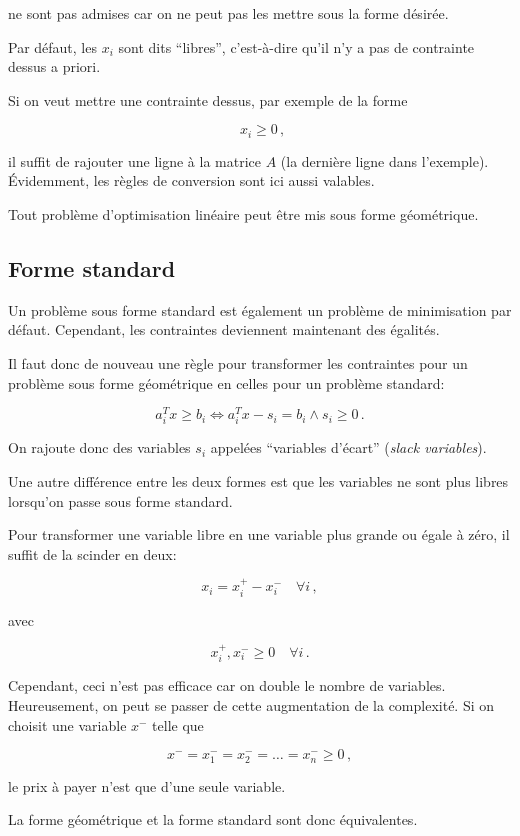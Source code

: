 	ne sont pas admises car on ne peut pas les mettre sous la forme désirée.

	Par défaut, les $x_i$ sont dits ``libres'',
	c'est-à-dire qu'il n'y a pas de contrainte dessus a priori.

	Si on veut mettre une contrainte dessus, par exemple de la forme

	\[
	\phantom{,} x_i \ge 0\,,
	\]

	il suffit de rajouter une ligne à la matrice $A$
	(la dernière ligne dans l'exemple).
	Évidemment, les règles de conversion sont ici aussi valables.

	Tout problème d'optimisation linéaire
	peut être mis sous forme géométrique.

\subsection{Forme standard}

	Un problème sous forme standard est également
	un problème de minimisation par défaut.
	Cependant, les contraintes deviennent maintenant des égalités.

	Il faut donc de nouveau une règle
	pour transformer les contraintes
	pour un problème sous forme géométrique
	en celles pour un problème standard:

	\[
	a_i^T x \ge b_i \iff a_i^T x - s_i = b_i \land s_i \ge 0\,.
	\]

	On rajoute donc des variables $s_i$ appelées
	``variables d'écart'' (\emph{slack variables}).

	Une autre différence entre les deux formes est
	que les variables ne sont plus libres
	lorsqu'on passe sous forme standard.

	Pour transformer une variable libre
	en une variable plus grande ou égale à zéro,
	il suffit de la scinder en deux:

	\[
	x_i = x_i^+ - x_i^- \quad \forall i\,,
	\]

	avec

	\[
	x_i^+, x_i^- \ge 0 \quad \forall i\,.
	\]

	Cependant, ceci n'est pas efficace
	car on double le nombre de variables.
	Heureusement, on peut se passer de cette augmentation de la complexité.
	Si on choisit une variable $x^-$ telle que

	\[
	x^- = x_1^- = x_2^- = \dots = x_n^- \ge 0\,,
	\]

	le prix à payer n'est que d'une seule variable.

	La forme géométrique et la forme standard sont donc équivalentes.

